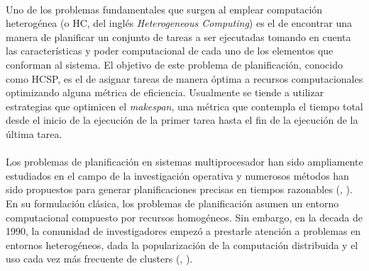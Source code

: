 \paragraph{}Uno de los problemas fundamentales que surgen al emplear computación heterogénea (o HC, del inglés \textit{Heterogeneous Computing}) es el de encontrar una manera de planificar un conjunto de tareas a ser ejecutadas tomando en cuenta las características y poder computacional de cada uno de los elementos que conforman al sistema.
El objetivo de este problema de planificación, conocido como HCSP, es el de asignar tareas de manera óptima a recursos computacionales optimizando alguna métrica de eficiencia.
Usualmente se tiende a utilizar estrategias que optimicen el \textit{makespan}, una métrica que contempla el tiempo total desde el inicio de la ejecución de la primer tarea hasta el fin de la ejecución de la última tarea.

\paragraph{}Los problemas de planificación en sistemas multiprocesador han sido ampliamente estudiados en el campo de la investigación operativa y numerosos métodos han sido propuestos para generar planificaciones precisas en tiempos razonables (\citet{bib-rewini-scheduling}, \citet{bib-leung-handbook}).
En su formulación clásica, los problemas de planificación asumen un entorno computacional compuesto por recursos homogéneos.
Sin embargo, en la decada de 1990, la comunidad de investigadores empezó a prestarle atención a problemas en entornos heterogéneos, dada la popularización de la computación distribuida y el uso cada vez más frecuente de clusters (\citet{bib-freund}, \citet{bib-eshaghian-heterogeneous}).

